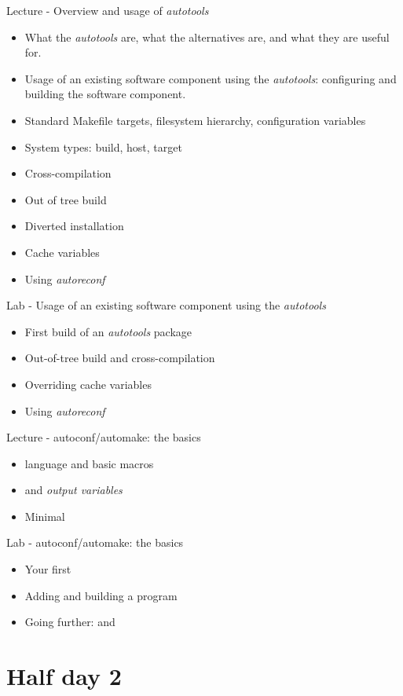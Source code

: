 \documentclass[a4paper,12pt,obeyspaces,spaces,hyphens]{article}
\begin{document}
\feagendatwocolumn
{Lecture - Overview and usage of {\em autotools}}
{
  \begin{itemize}
  \item What the {\em autotools} are, what the alternatives are, and
    what they are useful for.
  \item Usage of an existing software component using the {\em
      autotools}: configuring and building the software component.
  \item Standard Makefile targets, filesystem hierarchy, configuration variables
  \item System types: build, host, target
  \item Cross-compilation
  \item Out of tree build
  \item Diverted installation
  \item Cache variables
  \item Using {\em autoreconf}
  \end{itemize}
}
{Lab - Usage of an existing software component using the {\em autotools}}
{
  \begin{itemize}
  \item First build of an {\em autotools} package
  \item Out-of-tree build and cross-compilation
  \item Overriding cache variables
  \item Using {\em autoreconf}
  \end{itemize}
}

\feagendaonecolumn
{Lecture - autoconf/automake: the basics}
{
  \begin{itemize}
  \item {} language and basic macros
  \item {} and {\em output variables}
  \item Minimal 
  \end{itemize}
}

\feagendaonecolumn
{Lab - autoconf/automake: the basics}
{
  \begin{itemize}
  \item Your first 
  \item Adding and building a program
  \item Going further:  and 
  \end{itemize}
}

\section{Half day 2}
\end{document}
